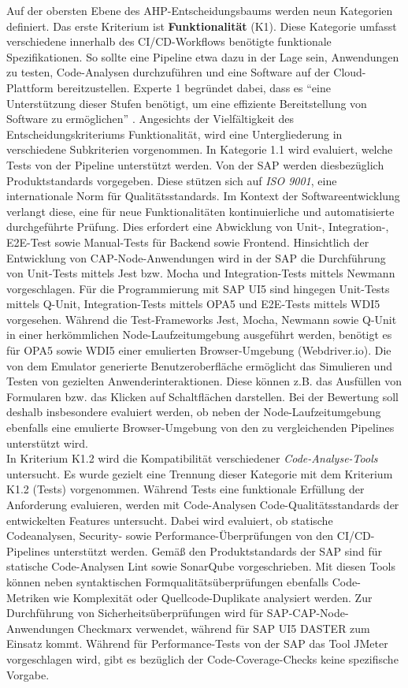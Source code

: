  Auf der obersten Ebene des AHP-Entscheidungsbaums werden neun Kategorien definiert. Das erste Kriterium ist \textbf{Funktionalität} (K1). Diese Kategorie umfasst verschiedene innerhalb des CI/CD-Workflows benötigte funktionale Spezifikationen. So sollte eine Pipeline etwa dazu in der Lage sein, Anwendungen zu testen, Code-Analysen durchzuführen und eine Software auf der Cloud-Plattform bereitzustellen. Experte 1 begründet dabei, dass es \enquote{eine Unterstützung dieser Stufen benötigt, um eine effiziente Bereitstellung von Software zu ermöglichen} \cite[Z. 52]{ProductOwnerSAPBTPProd&Infra.}.  Angesichts der Vielfältigkeit des Entscheidungskriteriums Funktionalität, wird eine Untergliederung in verschiedene Subkriterien vorgenommen. In Kategorie 1.1 wird evaluiert, welche Tests von der Pipeline unterstützt werden. Von der SAP werden diesbezüglich Produktstandards vorgegeben. Diese stützen sich auf \textit{ISO 9001}, eine internationale Norm für Qualitätsstandards. Im Kontext der Softwareentwicklung verlangt diese, eine für neue Funktionalitäten kontinuierliche und automatisierte durchgeführte Prüfung. Dies erfordert eine Abwicklung von Unit-, Integration-, E2E-Test sowie Manual-Tests für Backend sowie Frontend. Hinsichtlich der Entwicklung von CAP-Node-Anwendungen wird in der SAP die Durchführung von Unit-Tests mittels Jest bzw. Mocha und Integration-Tests mittels Newmann vorgeschlagen. Für die Programmierung mit SAP UI5 sind hingegen Unit-Tests mittels Q-Unit, Integration-Tests mittels OPA5 und E2E-Tests mittels WDI5 vorgesehen. Während die Test-Frameworks Jest, Mocha, Newmann sowie Q-Unit in einer herkömmlichen Node-Laufzeitumgebung ausgeführt werden, benötigt es für OPA5 sowie WDI5 einer emulierten Browser-Umgebung (Webdriver.io). Die von dem Emulator generierte Benutzeroberfläche ermöglicht das Simulieren und Testen von gezielten Anwenderinteraktionen. Diese können z.B. das Ausfüllen von Formularen bzw. das Klicken auf Schaltflächen darstellen. Bei der Bewertung soll deshalb insbesondere evaluiert werden, ob neben der Node-Laufzeitumgebung ebenfalls eine emulierte Browser-Umgebung von den zu vergleichenden Pipelines unterstützt wird.\\ 
In Kriterium K1.2 wird die Kompatibilität verschiedener \textit{Code-Analyse-Tools} untersucht. Es wurde gezielt eine Trennung dieser Kategorie mit dem Kriterium K1.2 (Tests) vorgenommen. Während Tests eine funktionale Erfüllung der Anforderung evaluieren, werden mit Code-Analysen Code-Qualitätsstandards der entwickelten Features untersucht. Dabei wird evaluiert, ob statische Codeanalysen, Security- sowie Performance-Überprüfungen von den CI/CD-Pipelines unterstützt werden. Gemäß den Produktstandards der SAP sind für statische Code-Analysen Lint sowie SonarQube vorgeschrieben. Mit diesen Tools können neben syntaktischen Formqualitätsüberprüfungen ebenfalls Code-Metriken wie Komplexität oder Quellcode-Duplikate analysiert werden. Zur Durchführung von Sicherheitsüberprüfungen wird für SAP-CAP-Node-Anwendungen Checkmarx verwendet, während für SAP UI5 DASTER zum Einsatz kommt. Während für Performance-Tests von der SAP das Tool JMeter vorgeschlagen wird, gibt es bezüglich der Code-Coverage-Checks keine spezifische Vorgabe.\\
